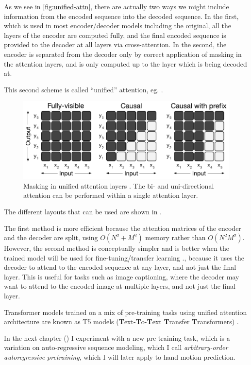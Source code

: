 As we see in \ref{fig:unified-attn}, there are actually two ways we might include information from the encoded sequence into the decoded sequence. In the first, which is used in most encoder/decoder models including the original, all the layers of the encoder are computed fully, and the final encoded sequence is provided to the decoder at all layers via cross-attention. In the second, the encoder is separated from the decoder only by correct application of masking in the attention layers, and is only computed up to the layer which is being decoded at.

This second scheme is called ``unified'' attention, eg. \cite{unilm,t5}.

\begin{figure}
    \includegraphics[width=\linewidth]{figures/attention_masks.pdf}
    \caption[Attention Masks]{Masking in unified attention layers \cite{unilm,t5}. The bi- and uni-directional attention can be performed within a single attention layer.}
    \label{fig:unified-masking}
\end{figure}

The different layouts that can be used are shown in .

The first method is more efficient because the attention matrices of the encoder and the decoder are split, using $O(N^2 +M^2)$ memory rather than $O(N^2M^2)$. However, the second method is conceptually simpler and is better when the trained model will be used for fine-tuning/transfer learning \cite{t5}., because it uses the decoder to attend to the encoded sequence at any layer, and not just the final layer. This is useful for tasks such as image captioning, where the decoder may want to attend to the encoded image at multiple layers, and not just the final layer.

Transformer models trained on a mix of pre-training tasks using unified attention architecture are known as T5 models (\textbf{T}ext-\textbf{T}o-\textbf{T}ext \textbf{T}ransfer \textbf{T}ransformers) \cite{t5}.




In the next chapter () I experiment with a new pre-training task, which is a variation on auto-regressive sequence modeling, which I call \textit{arbitrary-order autoregressive pretraining}, which I will later apply to hand motion prediction.

